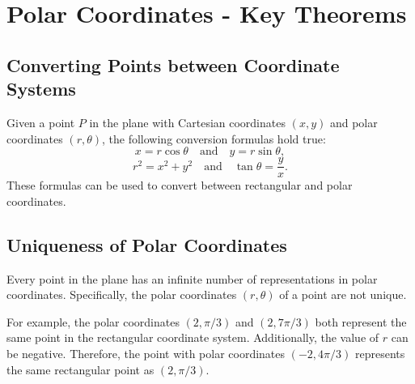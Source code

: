 \documentclass{article}
\begin{document}
\renewcommand{\familydefault}{\rmdefault}



\newpage
\setcounter{page}{0}
\tableofcontents
\newpage



\section*{Polar Coordinates - Key Theorems}

\subsection*{Converting Points between Coordinate Systems}
\begin{theorembox}
    Given a point \( P \) in the plane with Cartesian coordinates \( (x,y) \) and polar coordinates \( (r,\theta) \), the following conversion formulas hold true:
    \[
    x = r \cos\theta \quad \text{and} \quad y = r \sin\theta,
    \]
    \[
    r^2 = x^2 + y^2 \quad \text{and} \quad \tan\theta = \frac{y}{x}.
    \]
    These formulas can be used to convert between rectangular and polar coordinates.
\end{theorembox}

\subsection*{Uniqueness of Polar Coordinates}
\begin{propositionbox}
    Every point in the plane has an infinite number of representations in polar coordinates. Specifically, the polar coordinates \( (r, \theta) \) of a point are not unique.
    
    \begin{remarkbox}
        For example, the polar coordinates \( (2, \pi/3) \) and \( (2, 7\pi/3) \) both represent the same point in the rectangular coordinate system. Additionally, the value of \( r \) can be negative. Therefore, the point with polar coordinates \( (-2, 4\pi/3) \) represents the same rectangular point as \( (2, \pi/3) \).
    \end{remarkbox}
\end{propositionbox}
\end{document}
